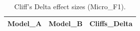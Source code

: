 \begin{table}[t]
\centering
\begin{tabular}{lll}
\toprule
Model_A & Model_B & Cliffs_Delta \\
\midrule
\bottomrule
\end{tabular}
\caption{Cliff's Delta effect sizes (Micro_F1).}
\label{tab:cliffs_Micro_F1}
\end{table}